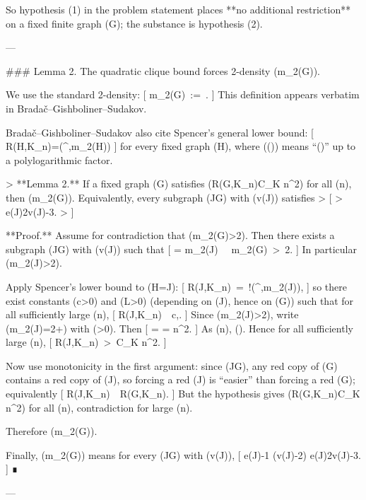 So hypothesis (1) in the problem statement places **no additional restriction** on a fixed finite graph (G); the substance is hypothesis (2).

---

### Lemma 2. The quadratic clique bound forces 2-density (m_2(G)).

We use the standard 2-density:
[
m_2(G)\ :=\ \max{}.
]
This definition appears verbatim in Bradač–Gishboliner–Sudakov.

Bradač–Gishboliner–Sudakov also cite Spencer’s general lower bound:
[
R(H,K_n)=\Omega(^{,m_2(H)})
]
for every fixed graph (H), where (\Omega(\tilde{\cdot})) means “(\ge)” up to a polylogarithmic factor.

> **Lemma 2.** If a fixed graph (G) satisfies (R(G,K_n)\le C_K n^2) for all (n), then (m_2(G)). Equivalently, every subgraph (J\subseteq G) with (v(J)) satisfies
> [
> e(J)\le 2v(J)-3.
> ]

**Proof.**
Assume for contradiction that (m_2(G)>2). Then there exists a subgraph (J\subseteq G) with (v(J)) such that
[
 = m_2(J) \ \ge\ m_2(G)\ >\ 2.
]
In particular (m_2(J)>2).

Apply Spencer’s lower bound to (H=J):
[
R(J,K_n)\ =\ \Omega!\big(^{,m_2(J)}\big),
]
so there exist constants (c>0) and (L>0) (depending on (J), hence on (G)) such that for all sufficiently large (n),
[
R(J,K_n)\ \ge\ c,.
]
Since (m_2(J)>2), write (m_2(J)=2+\varepsilon) with (\varepsilon>0). Then
[
 = 
= n^2\cdot {}.
]
As (n\to\infty), (\to\infty). Hence for all sufficiently large (n),
[
R(J,K_n)\ >\ C_K n^2.
]

Now use monotonicity in the first argument: since (J\subseteq G), any red copy of (G) contains a red copy of (J), so forcing a red (J) is “easier” than forcing a red (G); equivalently
[
R(J,K_n)\ \le\ R(G,K_n).
]
But the hypothesis gives (R(G,K_n)\le C_K n^2) for all (n), contradiction for large (n).

Therefore (m_2(G)).

Finally, (m_2(G)) means for every (J\subseteq G) with (v(J)),
[
\quad\Longrightarrow\quad
e(J)-1 (v(J)-2)
\quad\Longrightarrow\quad
e(J)\le 2v(J)-3.
]
∎

---

